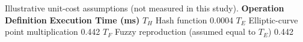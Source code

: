\documentclass[cmc,article,submit,moreauthors,pdftex]{Definitions/tsp}
\providecommand{\DIFdel}[1]{{\protect\color{red} \scriptsize #1}} %
\providecommand{\DIFdelFL}[1]{\DIFdel{#1}} %
\begin{document}
{%
\DIFdelFL{Illustrative unit-cost assumptions (not measured in this study).}%
}
\DIFdelFL{\textbf{Operation} }%
\DIFdelFL{\textbf{Definition} }%
\DIFdelFL{\textbf{Execution Time (ms)}}%
\DIFdelFL{$T_H$ }%
\DIFdelFL{Hash function }%
\DIFdelFL{0.0004}%
\DIFdelFL{$T_E$ }%
\DIFdelFL{Elliptic-curve point multiplication }%
\DIFdelFL{0.442}%
\DIFdelFL{$T_F$ }%
\DIFdelFL{Fuzzy reproduction (assumed equal to $T_E$)}%
\DIFdelFL{0.442}%

\end{document}
